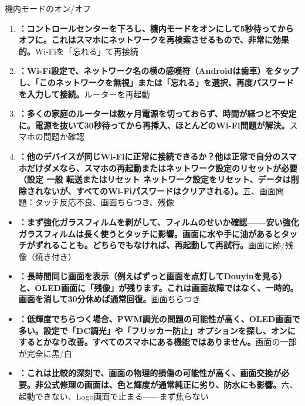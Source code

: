 
機内モードのオン/オフ

\begin{enumerate}
  \item \textbf{：コントロールセンターを下ろし、機内モードをオンにして5秒待ってからオフに。これはスマホにネットワークを再検索させるもので、非常に効果的。}Wi-Fiを「忘れる」て再接続
  \item \textbf{：Wi-Fi設定で、ネットワーク名の横の感嘆符（Androidは歯車）をタップし、「このネットワークを無視」または「忘れる」を選択、再度パスワードを入力して接続。}ルーターを再起動
  \item \textbf{：多くの家庭のルーターは数ヶ月電源を切っておらず、時間が経つと不安定に。電源を抜いて30秒待ってから再挿入、ほとんどのWi-Fi問題が解決。}スマホの問題か確認
  \item \textbf{：他のデバイスが同じWi-Fiに正常に接続できるか？他は正常で自分のスマホだけダメなら、スマホの再起動またはネットワーク設定のリセットが必要（設定 一般 転送またはリセット ネットワーク設定をリセット、データは削除されないが、すべてのWi-Fiパスワードはクリアされる）。}五、画面問題：タッチ反応不良、画面ちらつき、残像
\end{enumerate}


\begin{itemize}
  \item \textbf{：まず強化ガラスフィルムを剥がして、フィルムのせいか確認——安い強化ガラスフィルムは長く使うとタッチに影響。画面に水や手に油があるとタッチがずれることも。どちらでもなければ、再起動して再試行。}画面に跡/残像（焼き付き）
  \item \textbf{：長時間同じ画面を表示（例えばずっと画面を点灯してDouyinを見る）と、OLED画面に「残像」が残ります。これは画面故障ではなく、一時的。画面を消して30分休めば通常回復。}画面ちらつき
  \item \textbf{：低輝度でちらつく場合、PWM調光の問題の可能性が高く、OLED画面で多い。設定で「DC調光」や「フリッカー防止」オプションを探し、オンにするとかなり改善。すべてのスマホにある機能ではありません。}画面の一部が完全に黒/白
  \item \textbf{：これは比較的深刻で、画面の物理的損傷の可能性が高く、画面交換が必要。非公式修理の画面は、色と輝度が通常純正に劣り、防水にも影響。}六、起動できない、Logo画面で止まる——まず焦らない
\end{itemize}

